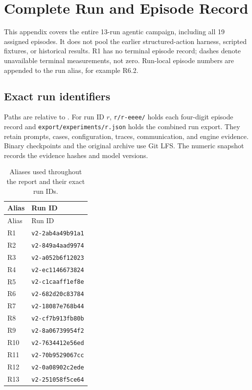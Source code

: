 \section{Complete Run and Episode Record}
\label{app:complete}
This appendix covers the entire 13-run agentic campaign, including all 19
assigned episodes. It does not pool the earlier structured-action harness,
scripted fixtures, or historical results. R1 has no terminal episode record;
dashes denote unavailable terminal measurements, not zero. Run-local episode
numbers are appended to the run alias, for example R6.2.

\subsection{Exact run identifiers}
Paths are relative to .
For run ID $r$, \texttt{r/r-eeee/} holds each four-digit episode record and
\texttt{export/experiments/r.json} holds the combined run export. They retain
prompts, cases, configuration, traces, communication, and engine evidence.
Binary checkpoints and the original archive use Git LFS.
The numeric snapshot records the evidence hashes and model versions.

\begin{longtable}{ll}
\caption{Aliases used throughout the report and their exact run IDs.}
\label{tab:run-ids}\\
\toprule Alias & Run ID\\\midrule
\endfirsthead
\toprule Alias & Run ID\\\midrule
\endhead
R1 & \texttt{v2-2ab4a49b91a1}\\
R2 & \texttt{v2-849a4aad9974}\\
R3 & \texttt{v2-a052b6f12023}\\
R4 & \texttt{v2-ec1146673824}\\
R5 & \texttt{v2-c1caaff1ef8e}\\
R6 & \texttt{v2-682d20c83784}\\
R7 & \texttt{v2-18087e768b44}\\
R8 & \texttt{v2-cf7b913fb80b}\\
R9 & \texttt{v2-8a06739954f2}\\
R10 & \texttt{v2-7634412e56ed}\\
R11 & \texttt{v2-70b9529067cc}\\
R12 & \texttt{v2-0a08902c2ede}\\
R13 & \texttt{v2-251058f5ce64}\\
\bottomrule
\end{longtable}

